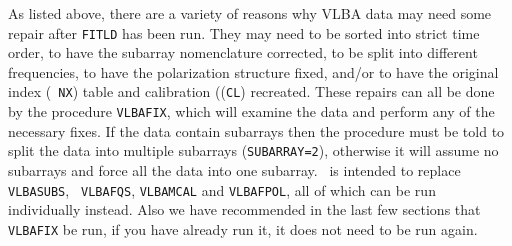 As listed above, there are a variety of reasons why VLBA data may need
some repair after {\tt FITLD} has been run.  They may need to be
sorted into strict time order, to have the subarray nomenclature
corrected, to be split into different frequencies, to have the
polarization structure fixed, and/or to have the original index ({\tt
NX}) table and calibration (({\tt CL}) recreated.  These repairs can
all be done by the procedure {\tt VLBAFIX}, which will examine the
data and perform any of the necessary fixes.  If the data contain
subarrays then the procedure must be told to split the data into
multiple subarrays ({\tt SUBARRAY=2}), otherwise it will assume no
subarrays and force all the data into one subarray.{\tt
{}} is intended to replace {\tt VLBASUBS}, {\tt
VLBAFQS}, {\tt VLBAMCAL} and {\tt VLBAFPOL}, all of which can be
run individually instead.  Also we have recommended in the last few
sections that {\tt VLBAFIX} be run, if you have already run it, it does not
need to be run again.


